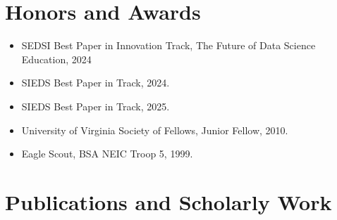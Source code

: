 \documentclass[10pt]{article}
\begin{document}
\section*{Honors and Awards}
\begin{itemize}
\item SEDSI Best Paper in Innovation Track, The Future of Data Science Education, 2024
\item SIEDS Best Paper in Track, 2024.
\item SIEDS Best Paper in Track, 2025.
\item University of Virginia Society of Fellows, Junior Fellow, 2010.
\item Eagle Scout, BSA NEIC Troop 5, 1999.
\end{itemize}

\section*{Publications and Scholarly Work}
\end{document}

